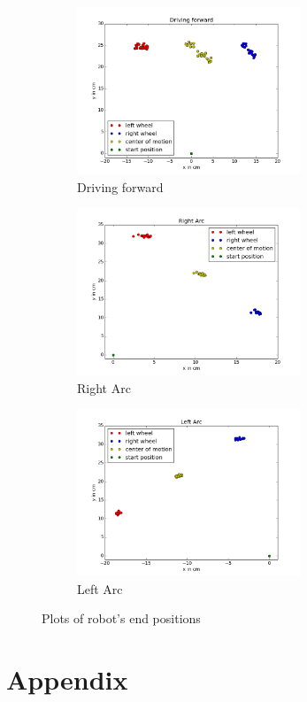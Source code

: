 \documentclass[paper=a4, fontsize=11pt]{scrartcl} %
\numberwithin{equation}{section} %
\numberwithin{figure}{section} %
\numberwithin{table}{section} %
\begin{document}
\begin{figure}[H]
 
\begin{subfigure}{0.5\textwidth}
\includegraphics[width=0.9\linewidth, height=5cm]{forward.png} 
\caption{Driving forward}
\label{fig:sub_forward}
\end{subfigure}
\begin{subfigure}{0.5\textwidth}
\includegraphics[width=0.9\linewidth, height=5cm]{right_arc.png}
\caption{Right Arc}
\label{fig:sub_right}
\end{subfigure}
\begin{subfigure}{0.5\textwidth}
\includegraphics[width=0.9\linewidth, height=5cm]{left_arc.png}
\caption{Left Arc}
\label{fig:sub_left}
\end{subfigure}
 
\caption{Plots of robot's end positions}
\label{fig:plots}
\end{figure}

\section{Appendix}
\label{sec:appendix}


\end{document}
